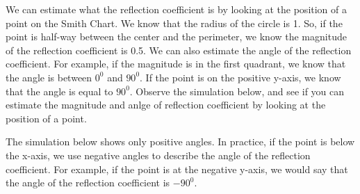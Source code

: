 \documentclass{ximera}
\begin{document}
\begin{example}
We can estimate what the reflection coefficient is by looking at the position of a point on the Smith Chart. We know that the radius of the circle is 1. So, if the point is half-way between the center and the perimeter, we know the magnitude of the reflection coefficient is 0.5. We can also estimate the angle of the reflection coefficient. For example, if the magnitude is in the first quadrant, we know that the angle is between $0^0$ and $90^0$. If the point is on the positive y-axis, we know that the angle is equal to $90^0$. Observe the simulation below, and see if you can estimate the magnitude and anlge of reflection coefficient by looking at the position of a point. 

The simulation below shows only positive angles. In practice, if the point is below the x-axis, we use negative angles to describe the angle of the reflection coefficient. For example, if the point is at the negative y-axis, we would say that the angle of the reflection coefficient is  $-90^0$.

 
\begin{center}  
\end{center} 

\end{example}
\end{document}
